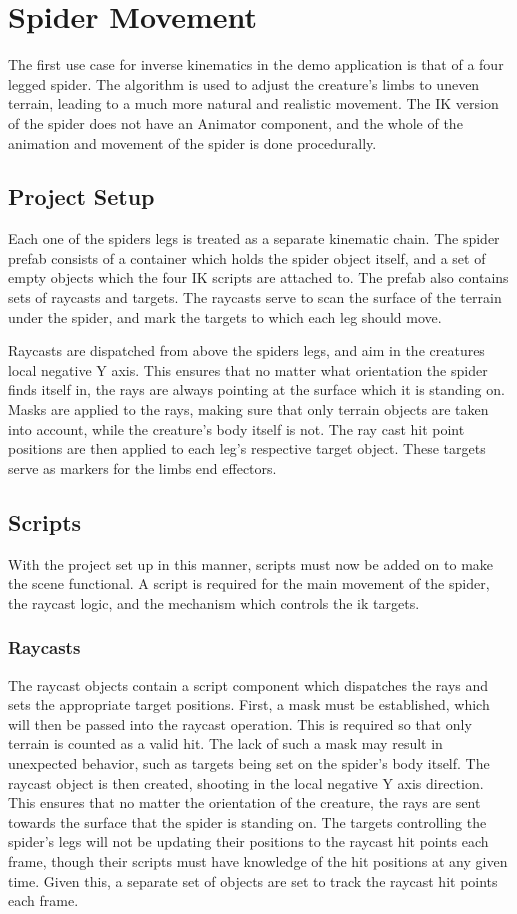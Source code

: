 \section{Spider Movement}
The first use case for inverse kinematics in the demo application is that of
a four legged spider. The algorithm is used to adjust the creature's limbs to
uneven terrain, leading to a much more natural and realistic movement. The IK
version of the spider does not have an Animator component, and the whole of the
animation and movement of the spider is done procedurally.
\subsection{Project Setup}
Each one of the spiders legs is treated as a separate kinematic chain. The
spider prefab consists of a container which holds the spider object itself, and
a set of empty objects which the four IK scripts are attached to. The prefab
also contains sets of raycasts and targets. The raycasts serve to scan the
surface of the terrain under the spider, and mark the targets to which each leg
should move.

Raycasts are dispatched from above the spiders legs, and aim in the creatures
local negative Y axis. This ensures that no matter what orientation the spider
finds itself in, the rays are always pointing at the surface which it is
standing on. Masks are applied to the rays, making sure that only terrain
objects are taken into account, while the creature's body itself is not. The ray
cast hit point positions are then applied to each leg's respective target
object. These targets serve as markers for the limbs end effectors. 

\subsection{Scripts}
With the project set up in this manner, scripts must now be added on to make the
scene functional. A script is required for the main movement of the spider, the
raycast logic, and the mechanism which controls the ik targets.

\subsubsection{Raycasts}
The raycast objects contain a script component which dispatches the rays and
sets the appropriate target positions. First, a mask must be established, which
will then be passed into the raycast operation. This is required so that only
terrain is counted as a valid hit. The lack of such a mask may result in
unexpected behavior, such as targets being set on the spider's body itself. The
raycast object is then created, shooting in the local negative Y axis
direction. This ensures that no matter the orientation of the creature, the rays
are sent towards the surface that the spider is standing on. The targets
controlling the spider's legs will not be updating their positions to the
raycast hit points each frame, though their scripts must have knowledge of the
hit positions at any given time. Given this, a separate set of objects are set
to track the raycast hit points each frame.


